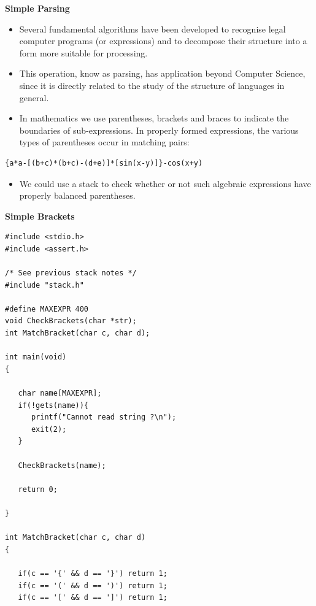 \documentclass[a4,portraitt]{slides}
\begin{document}
{\newpage
{\samepage
\begin{center}
{\Large{\bf Simple Parsing}}
\end{center}
\begin{itemize}
\item Several fundamental algorithms have been developed
to recognise legal computer programs (or expressions) and to
decompose their structure into a form more suitable for processing.
\item This operation, know as parsing, has application
beyond Computer Science, since it is directly related to the study of
the structure of languages in general.
\item In mathematics we use parentheses, brackets and
braces to indicate the boundaries of sub-expressions.
In properly formed expressions, the various types of parentheses occur in
matching pairs:
\end{itemize}
\begin{center}
{\small
\begin{verbatim}
{a*a-[(b+c)*(b+c)-(d+e)]*[sin(x-y)]}-cos(x+y)
\end{verbatim}
}
\end{center}
\begin{itemize}
\item We could use a stack to check whether or not such algebraic expressions
have properly balanced parentheses.
\end{itemize}
}

\newpage
{\samepage
\begin{center}
{\Large{\bf Simple Brackets}}
\end{center}
{\small
\begin{verbatim}
#include <stdio.h>
#include <assert.h>

/* See previous stack notes */
#include "stack.h"

#define MAXEXPR 400
void CheckBrackets(char *str);
int MatchBracket(char c, char d);

int main(void)
{

   char name[MAXEXPR];
   if(!gets(name)){
      printf("Cannot read string ?\n");
      exit(2);
   }

   CheckBrackets(name);

   return 0;

}

int MatchBracket(char c, char d)
{

   if(c == '{' && d == '}') return 1;
   if(c == '(' && d == ')') return 1;
   if(c == '[' && d == ']') return 1;


\end{verbatim}}}}
\end{document}
